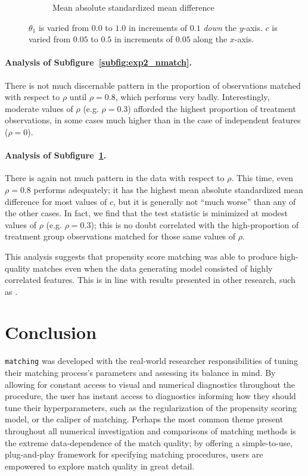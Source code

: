 \documentclass[11pt]{extarticle}
\begin{document}
\begin{figure}[h!]
\begin{center}
\begin{subfigure}[t]{0.49\textwidth}
        \caption{Mean absolute standardized mean difference}
        \label{subfig:exp2_mean_abs_smd}
    \end{subfigure}
    \caption{$\theta_1$ is varied from $0.0$ to $1.0$ in increments of $0.1$ \emph{down} the $y$-axis. $c$ is varied from $0.05$ to $0.5$ in increments of $0.05$ along the $x$-axis.}
    \label{fig:exp2}
  \end{center}
\end{figure}
\paragraph{Analysis of Subfigure~\ref{subfig:exp2_nmatch}.} There is not much discernable pattern in the proportion of observations matched with respect to $\rho$ until $\rho=0.8$, which performs very badly. Interestingly, moderate values of $\rho$ (e.g. $\rho=0.3$) afforded the highest proportion of treatment observations, in some cases much higher than in the case of independent features ($\rho = 0$).
\paragraph{Analysis of Subfigure~\ref{subfig:exp2_mean_abs_smd}.} There is again not much pattern in the data with respect to $\rho$. This time, even $\rho=0.8$ performs adequately; it has the highest mean absolute standardized mean difference for most values of $c$, but it is generally not ``much worse'' than any of the other cases. In fact, we find that the test statistic is minimized at modest values of $\rho$ (e.g. $\rho=0.3$); this is no doubt correlated with the high-proportion of treatment group observations matched for those same values of $\rho$.

This analysis suggests that propensity score matching was able to produce high-quality matches even when the data generating model consisted of highly correlated features. This is in line with results presented in other research, such as \textcite{austin_optimal_2011}.

\section{Conclusion}

\texttt{matching} was developed with the real-world researcher responsibilities of tuning their matching process's parameters and assessing its balance in mind. By allowing for constant access to visual and numerical diagnostics throughout the procedure, the user has instant access to diagnostics informing how they should tune their hyperparameters, such as the regularization of the propensity scoring model, or the caliper of matching.
Perhaps the most common theme present throughout all numerical investigation and comparisons of matching methods is the extreme data-dependence of the match quality; by offering a simple-to-use, plug-and-play framework for specifying matching procedures, users are empowered to explore match quality in great detail.
\end{document}
